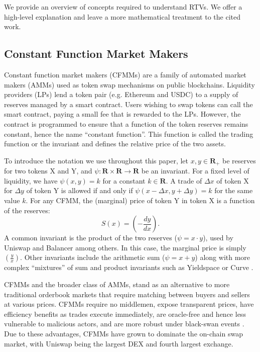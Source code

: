 \documentclass[hidelinks, 12pt]{article}
\begin{document}
We provide an overview of concepts required to understand RTVs. We offer a high-level explanation and leave a more mathematical treatment to the cited work.

\subsection{Constant Function Market Makers}

Constant function market makers (CFMMs) are a family of automated market makers (AMMs) used as token swap mechanisms on public blockchains. Liquidity providers (LPs) lend a token pair (e.g. Ethereum and USDC) to a supply of reserves managed by a smart contract. Users wishing to swap tokens can call the smart contract, paying a small fee that is rewarded to the LPs. However, the contract is programmed to ensure that a function of the token reserves remains constant, hence the name ``constant function''. This function is called the trading function or the invariant and defines the relative price of the two assets.

To introduce the notation we use throughout this paper, let $x, y \in \mathbf{R}_+$ be reserves for two tokens X and Y, and $\psi: \mathbf{R} \times \mathbf{R} \rightarrow \mathbf{R}$ be an invariant. For a fixed level of liquidity, we have $\psi(x, y) = k$ for a constant $k \in \mathbf{R}$. A trade of $\Delta x$ of token X for $\Delta y$ of token Y is allowed if and only if $\psi(x - \Delta x, y + \Delta y) = k$ for the same value $k$. For any CFMM, the (marginal) price of token Y in token X is a function of the reserves:
\[S(x) = \left(-\frac{dy}{dx}\right).\]
A common invariant is the product of the two reserves ($\psi = x\cdot y$), used by Uniswap \cite{angeris2019analysis,adams2021uniswap} and Balancer \cite{martinelli2019non} among others.
In this case, the marginal price is simply $\left(\frac{y}{x}\right)$.
Other invariants include the arithmetic sum ($\psi = x + y$) along with more complex ``mixtures'' of sum and product invariants such as Yieldspace \cite{niemerg2020yieldspace} or Curve \cite{egorov2021automatic}.

CFMMs and the broader class of AMMs, stand as an alternative to more traditional orderbook markets that require matching between buyers and sellers at various prices. CFMMs require no middlemen, expose transparent prices, have efficiency benefits as trades execute immediately, are oracle-free and hence less vulnerable to malicious actors, and are more robust under black-swan events \cite{chitra2021liveness}. Due to these advantages, CFMMs have grown to dominate the on-chain swap market, with Uniswap being the largest DEX and fourth largest exchange.
\end{document}
